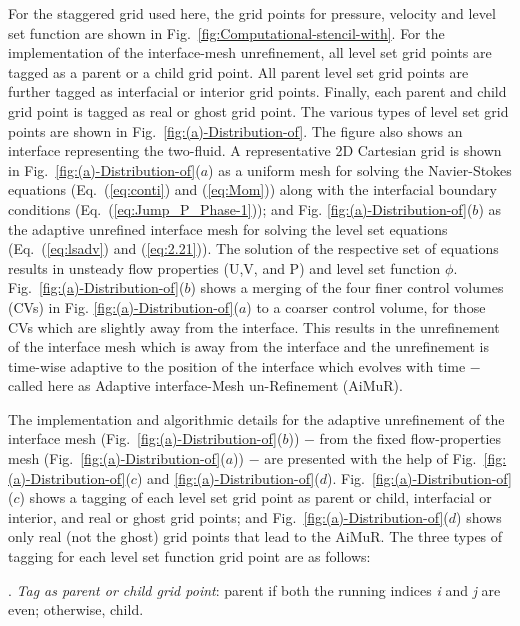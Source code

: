 \documentclass[preprint,12pt]{elsarticle}
\begin{document}
For the staggered grid used here, the grid points  for pressure, velocity
and level set function are shown in Fig.~\ref{fig:Computational-stencil-with}.
 For the implementation of the interface-mesh unrefinement,  all level
set grid points are tagged as a parent or a child grid point. All parent level set grid points are further tagged as interfacial or interior grid points. Finally, each parent and child grid point is tagged as real or ghost grid point. The various types of level set grid points are shown in
Fig.~\ref{fig:(a)-Distribution-of}. The figure also shows an interface
representing the two-fluid. A representative 2D Cartesian grid is shown in Fig.~\ref{fig:(a)-Distribution-of}($a$)
as a uniform mesh for solving the Navier-Stokes equations (Eq.~(\ref{eq:conti})
and (\ref{eq:Mom})) along with the interfacial boundary conditions
(Eq.~(\ref{eq:Jump_P_Phase-1})); and Fig. \ref{fig:(a)-Distribution-of}($b$)
as the adaptive unrefined interface mesh for solving the level set equations
(Eq.~(\ref{eq:lsadv}) and (\ref{eq:2.21})). The solution of the
respective set of equations results in unsteady flow properties (U,V,
and P) and level set function $\phi$. Fig.~\ref{fig:(a)-Distribution-of}($b$)
shows a merging of the four finer control volumes (CVs) in Fig. \ref{fig:(a)-Distribution-of}($a$) to a coarser control volume, for those CVs which are slightly away
from the interface. This results in the unrefinement of the interface
mesh which is away from the interface and the unrefinement is time-wise adaptive to the position of the interface which evolves with
time $-$ called here as Adaptive interface-Mesh un-Refinement (AiMuR).

The implementation and algorithmic details for the adaptive unrefinement
of the interface mesh (Fig.~\ref{fig:(a)-Distribution-of}($b$)) $-$
from the fixed flow-properties mesh (Fig.~\ref{fig:(a)-Distribution-of}($a$))
$-$ are presented with the help of Fig.~\ref{fig:(a)-Distribution-of}($c$)
and \ref{fig:(a)-Distribution-of}($d$). Fig.~\ref{fig:(a)-Distribution-of}($c$)
shows a tagging of each level set grid point as parent or child, interfacial
or interior, and real or ghost grid points; and Fig.~\ref{fig:(a)-Distribution-of}($d$)
shows only real (not the ghost) grid points that lead to the AiMuR.
The three types of tagging for each level set function grid point
are as follows:

. \textit{Tag as parent or child grid point}: parent if
both the running indices \textit{i} and \textit{j} are even; otherwise,
child.
\end{document}
